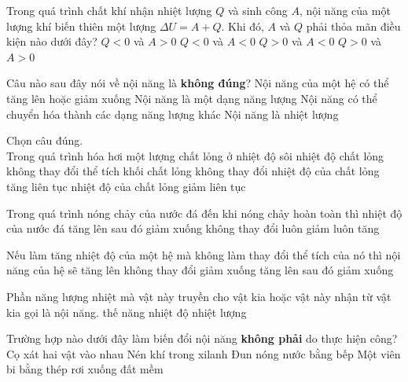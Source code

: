 \begin{ex}
	Trong quá trình chất khí nhận nhiệt lượng $Q$ và sinh công $A$, nội năng của một lượng khí biến thiên một lượng $\Delta U=A+Q$. Khi đó, $A$ và $Q$ phải thỏa mãn điều kiện nào dưới đây?
	\choice
	{$Q<0$ và $A>0$}
	{$Q<0$ và $A<0$}
	{\True $Q>0$ và $A<0$}
	{$Q>0$ và $A>0$}
	\loigiai{}
\end{ex}
\begin{ex}
	Câu nào sau đây nói về nội năng là \textbf{không đúng}?
	\choice
	{Nội năng của một hệ có thể tăng lên hoặc giảm xuống}
	{Nội năng là một dạng năng lượng}
	{Nội năng có thể chuyển hóa thành các dạng năng lượng khác}
	{\True Nội năng là nhiệt lượng}
	\loigiai{}
\end{ex}
\begin{ex}
	Chọn câu đúng.\\ 
	Trong quá trình hóa hơi một lượng chất lỏng ở nhiệt độ sôi
	\choice
	{\True nhiệt độ chất lỏng không thay đổi}
	{thể tích khối chất lỏng không thay đổi}
	{nhiệt độ của chất lỏng tăng liên tục}
	{nhiệt độ của chất lỏng giảm liên tục}
	\loigiai{}
\end{ex}
\begin{ex}
	Trong quá trình nóng chảy của nước đá đến khi nóng chảy hoàn toàn thì nhiệt độ của nước đá	
	\choice
	{tăng lên sau đó giảm xuống}
	{\True không thay đổi}
	{luôn giảm}
	{luôn tăng}
	\loigiai{}
\end{ex}
\begin{ex}
	Nếu làm tăng nhiệt độ của một hệ mà không làm thay đổi thể tích của nó thì nội năng của hệ sẽ
	\choice
	{\True tăng lên}
	{không thay đổi}
	{giảm xuống}
	{tăng lên sau đó giảm xuống}
	\loigiai{}
\end{ex}
\begin{ex}
	Phần năng lượng nhiệt mà vật này truyền cho vật kia hoặc vật này nhận từ vật kia gọi là	
	\choice
	{nội năng.}
	{thế năng}
	{nhiệt độ}
	{\True nhiệt lượng}
	\loigiai{}
\end{ex}
\begin{ex}
	Trường hợp nào dưới đây làm biến đổi nội năng \textbf{không phải} do thực hiện công?	
	\choice
	{Cọ xát hai vật vào nhau}
	{Nén khí trong xilanh}
	{\True Đun nóng nước bằng bếp}
	{Một viên bi bằng thép rơi xuống đất mềm}
	\loigiai{}
\end{ex}
